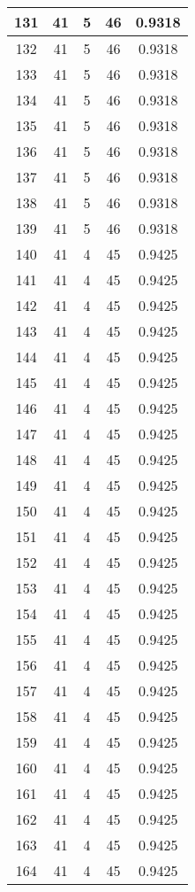 \documentclass[letterpaper, 12pt]{article}
\begin{document}
\begin{longtable}{|c|c|c|c|c|}
\hline
131 & 41 & 5 & 46 & 0.9318 \\
\hline
132 & 41 & 5 & 46 & 0.9318 \\
\hline
133 & 41 & 5 & 46 & 0.9318 \\
\hline
134 & 41 & 5 & 46 & 0.9318 \\
\hline
135 & 41 & 5 & 46 & 0.9318 \\
\hline
136 & 41 & 5 & 46 & 0.9318 \\
\hline
137 & 41 & 5 & 46 & 0.9318 \\
\hline
138 & 41 & 5 & 46 & 0.9318 \\
\hline
139 & 41 & 5 & 46 & 0.9318 \\
\hline
140 & 41 & 4 & 45 & 0.9425 \\
\hline
141 & 41 & 4 & 45 & 0.9425 \\
\hline
142 & 41 & 4 & 45 & 0.9425 \\
\hline
143 & 41 & 4 & 45 & 0.9425 \\
\hline
144 & 41 & 4 & 45 & 0.9425 \\
\hline
145 & 41 & 4 & 45 & 0.9425 \\
\hline
146 & 41 & 4 & 45 & 0.9425 \\
\hline
147 & 41 & 4 & 45 & 0.9425 \\
\hline
148 & 41 & 4 & 45 & 0.9425 \\
\hline
149 & 41 & 4 & 45 & 0.9425 \\
\hline
150 & 41 & 4 & 45 & 0.9425 \\
\hline
151 & 41 & 4 & 45 & 0.9425 \\
\hline
152 & 41 & 4 & 45 & 0.9425 \\
\hline
153 & 41 & 4 & 45 & 0.9425 \\
\hline
154 & 41 & 4 & 45 & 0.9425 \\
\hline
155 & 41 & 4 & 45 & 0.9425 \\
\hline
156 & 41 & 4 & 45 & 0.9425 \\
\hline
157 & 41 & 4 & 45 & 0.9425 \\
\hline
158 & 41 & 4 & 45 & 0.9425 \\
\hline
159 & 41 & 4 & 45 & 0.9425 \\
\hline
160 & 41 & 4 & 45 & 0.9425 \\
\hline
161 & 41 & 4 & 45 & 0.9425 \\
\hline
162 & 41 & 4 & 45 & 0.9425 \\
\hline
163 & 41 & 4 & 45 & 0.9425 \\
\hline
164 & 41 & 4 & 45 & 0.9425 \\

\end{longtable}
\end{document}
